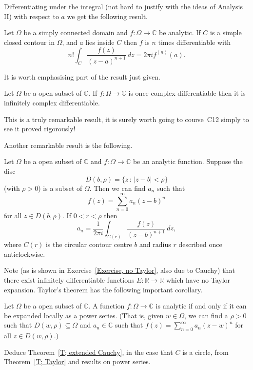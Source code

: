 Differentiating under the integral (not hard to justify
with the ideas of Analysis II) 
with respect to $a$ we get
the following result.
\begin{theorem}%
\label{T; extended Cauchy} 
Let $\Omega$
be a simply connected domain and $f:\Omega\rightarrow{\mathbb C}$
be analytic. If $C$ is a simple closed contour in $\Omega$,
and $a$ lies inside $C$
then $f$ is $n$ times differentiable with
\[n!\int_{C}\frac{f(z)}{(z-a)^{n+1}}\,dz=2\pi i f^{(n)}(a).\]
\end{theorem}
It is worth emphasising part of the result just given.
\begin{theorem} 
Let $\Omega$ be a open subset of ${\mathbb C}$.
If $f:{\Omega}\rightarrow{\mathbb C}$ is once
complex differentiable then it is infinitely complex
differentiable.
\end{theorem}
This is a truly remarkable result, it is surely worth
going to course~C12 simply to see it proved rigorously!

Another remarkable result is the following.
\begin{theorem}\label{T; Taylor}
Let $\Omega$ be a open subset of ${\mathbb C}$
and $f:{\Omega}\rightarrow{\mathbb C}$ be an analytic
function. Suppose the disc
\[D(b,\rho)=\{z\,:\,|z-b|<\rho\}\]
(with $\rho>0$) is a subset of $\Omega$.
Then we can find $a_{n}$ such that
\[f(z)=\sum_{n=0}^{\infty}a_{n}(z-b)^{n}\]
for all $z\in D(b,\rho)$.
If $0<r<\rho$ then
\[a_{n}=\frac{1}{2\pi i}\int_{C(r)}\frac{f(z)}{(z-b)^{n+1}}\,dz,\]
where $C(r)$ is the circular contour centre $b$
and radius $r$ described once anticlockwise.
\end{theorem} 
Note (as is shown in Exercise~\ref{Exercise, no Taylor}, 
also due to Cauchy) that
there exist infinitely differentiable functions
$E:{\mathbb R}\rightarrow{\mathbb R}$ which have
no Taylor expansion. Taylor's theorem has the following
important corollary.
\begin{theorem}\label{T, power}
Let $\Omega$ be a open subset of ${\mathbb C}$.
A function $f:{\Omega}\rightarrow{\mathbb C}$ is analytic
if and only if it can be expanded locally as a power
series. (That is, given $w\in\Omega$, we can find a $\rho>0$
such that $D(w,\rho)\subseteq\Omega$ and $a_{n}\in{\mathbb C}$
such that 
$f(z)=\sum_{n=0}^{\infty}a_{n}(z-w)^{n}$
for all $z\in D(w,\rho)$.)
\end{theorem}
\begin{exercise} Deduce Theorem~\ref{T; extended Cauchy},
in the case that $C$ is a circle, from Theorem~\ref{T; Taylor}
and results on power series.
\end{exercise}

